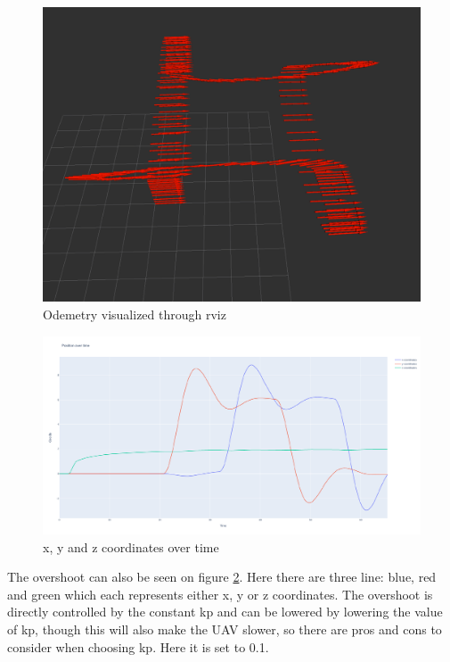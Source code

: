 \documentclass[conference]{IEEEtran}
\begin{document}
\begin{figure}[hbtp]
	\centering
	\includegraphics[width=1.0\linewidth]{images/rviz_hw3.pdf}
	\caption{Odemetry visualized through rviz}
	\label{fig:rviz}
\end{figure}


\begin{figure}[hbtp]
	\centering
	\includegraphics[width=1.0\linewidth]{images/xyz_over_time.pdf}
	\caption{x, y and z coordinates over time}
	\label{fig:xyz_over_time}
\end{figure}
\newpage
The overshoot can also be seen on figure \ref{fig:xyz_over_time}. Here there are three line: blue, red and green which each represents either x, y or z coordinates. The overshoot is directly controlled by the constant kp and can be lowered by lowering the value of kp, though this will also make the UAV slower, so there are pros and cons to consider when choosing kp. Here it is set to 0.1. 
\end{document}
